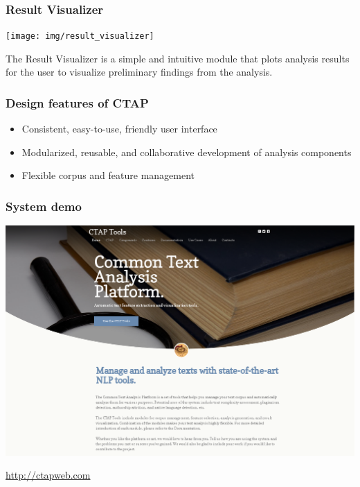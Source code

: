 \documentclass{beamer}
\begin{document}
	\begin{frame}
		\frametitle{Result Visualizer}

				  \texttt{[image: img/result\_visualizer]}

					The Result Visualizer is a simple and intuitive module that
					plots analysis results for the user to visualize preliminary
					findings from the analysis.
	\end{frame}
	
	\begin{frame}
		\frametitle{Design features of CTAP}
		
		\begin{itemize}
			\item Consistent, easy-to-use, friendly user interface
			\item Modularized, reusable, and collaborative development of analysis
			components
			\item Flexible corpus and feature management
		\end{itemize}

	\end{frame}

	\begin{frame}
		\frametitle{System demo}

		\centering
		\includegraphics[width=.8\textwidth]{img/ctapweb}

		\url{http://ctapweb.com}
	\end{frame}
\end{document}

